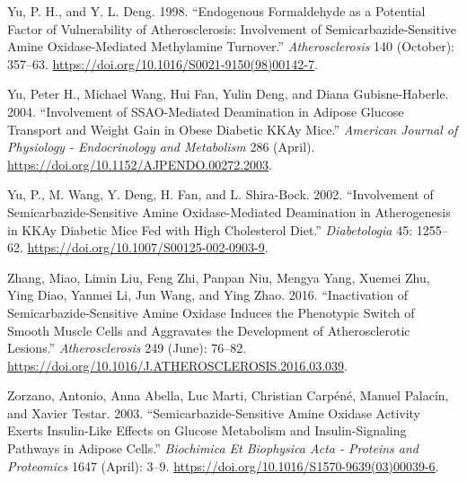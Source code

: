 \documentclass[
  letterpaper,
  DIV=11,
  numbers=noendperiod]{scrreprt}
\newlength{\cslhangindent}
\newenvironment{CSLReferences}[2] %
 {\begin{list}{}{%
  \setlength{\itemindent}{0pt}
  \setlength{\leftmargin}{0pt}
  \setlength{\parsep}{0pt}
  \ifodd #1
   \setlength{\leftmargin}{\cslhangindent}
   \setlength{\itemindent}{-1\cslhangindent}
  \fi
  \setlength{\itemsep}{#2\baselineskip}}}
 {\end{list}}
\begin{document}
\begin{CSLReferences}{1}{0}
Yu, P. H., and Y. L. Deng. 1998. {``Endogenous Formaldehyde as a
Potential Factor of Vulnerability of Atherosclerosis: Involvement of
Semicarbazide-Sensitive Amine Oxidase-Mediated Methylamine Turnover.''}
\emph{Atherosclerosis} 140 (October): 357--63.
\url{https://doi.org/10.1016/S0021-9150(98)00142-7}.

Yu, Peter H., Michael Wang, Hui Fan, Yulin Deng, and Diana
Gubisne-Haberle. 2004. {``Involvement of SSAO-Mediated Deamination in
Adipose Glucose Transport and Weight Gain in Obese Diabetic KKAy
Mice.''} \emph{American Journal of Physiology - Endocrinology and
Metabolism} 286 (April).
\url{https://doi.org/10.1152/AJPENDO.00272.2003}.

Yu, P., M. Wang, Y. Deng, H. Fan, and L. Shira-Bock. 2002.
{``Involvement of Semicarbazide-Sensitive Amine Oxidase-Mediated
Deamination in Atherogenesis in KKAy Diabetic Mice Fed with High
Cholesterol Diet.''} \emph{Diabetologia} 45: 1255--62.
\url{https://doi.org/10.1007/S00125-002-0903-9}.

Zhang, Miao, Limin Liu, Feng Zhi, Panpan Niu, Mengya Yang, Xuemei Zhu,
Ying Diao, Yanmei Li, Jun Wang, and Ying Zhao. 2016. {``Inactivation of
Semicarbazide-Sensitive Amine Oxidase Induces the Phenotypic Switch of
Smooth Muscle Cells and Aggravates the Development of Atherosclerotic
Lesions.''} \emph{Atherosclerosis} 249 (June): 76--82.
\url{https://doi.org/10.1016/J.ATHEROSCLEROSIS.2016.03.039}.

Zorzano, Antonio, Anna Abella, Luc Marti, Christian Carpéné, Manuel
Palacín, and Xavier Testar. 2003. {``Semicarbazide-Sensitive Amine
Oxidase Activity Exerts Insulin-Like Effects on Glucose Metabolism and
Insulin-Signaling Pathways in Adipose Cells.''} \emph{Biochimica Et
Biophysica Acta - Proteins and Proteomics} 1647 (April): 3--9.
\url{https://doi.org/10.1016/S1570-9639(03)00039-6}.

\end{CSLReferences}
\end{document}
